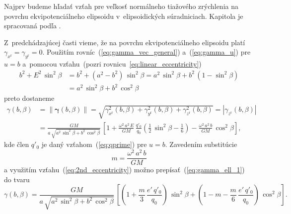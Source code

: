 \documentclass[a4paper, 12pt]{book}
\begin{document}
Najprv budeme hľadať vzťah pre veľkosť normálneho tiažového zrýchlenia na 
povrchu ekvipotenciálneho elipsoidu v~elipsoidických súradniciach.  Kapitola je 
spracovaná podľa \textcite{MoritzPhysicalGeodesy}.

Z~predchádzajúcej časti vieme, že na povrchu ekvipotenciálneho elipsoidu platí 
$\gamma_{x^\mathrm{r}} = \gamma_{y^\mathrm{r}} = 0$.  Použitím 
rovníc~(\ref{eq:gamma_vec_general}) a~(\ref{eq:gamma_u}) pre $u = b$ a~pomocou 
vzťahu~(pozri rovnicu~\ref{eq:linear_eccentricity})
%
\begin{equation}
\begin{split}
b^2 + E^2 \, \sin^2\beta &= b^2 + (a^2 - b^2) \, \sin^2\beta = a^2 \, 
\sin^2\beta + b^2 \, (1 - \sin^2\beta)\\
%
&= a^2 \, \sin^2\beta + b^2 \, \cos^2\beta
\end{split}
\end{equation}
%
preto dostaneme
%
\begin{equation}
\label{eq:gamma_ell_1}
\begin{split}
\gamma(b, \beta) &= \| \boldsymbol \gamma(b, \beta) \| 
= \sqrt{\gamma^2_{x^\mathrm{r}}(b, \beta) + \gamma^2_{y^\mathrm{r}}(b, \beta) 
+ \gamma^2_{z^\mathrm{r}}(b, \beta)} = | \gamma_{z^\mathrm{r}}(b, \beta) |\\
%
&= \frac{GM}{a \, \sqrt{a^2 \, \sin^2\beta + b^2 \, \cos^2\beta}} \, \left[ 
1 + \frac{\omega^2 \, a^2 \, E}{GM} \, \frac{q'_0}{q_0} \left( \frac{1}{2} \, 
\sin^2\beta - \frac{1}{6} \right) - \frac{\omega^2 \, a^2 \, b}{GM} \, 
\cos^2\beta \right]
{,}
\end{split}
\end{equation}
%
kde člen $q'_0$ je daný vzťahom~(\ref{eq:qprime}) pre $u = b$.  Zavedením 
substitúcie
%
\begin{equation}
m = \frac{\omega^2 \, a^2 \, b}{GM}
\end{equation}
%
a využitím vzťahu~(\ref{eq:2nd_eccentricity}) možno 
prepísať~(\ref{eq:gamma_ell_1}) do tvaru
%
\begin{equation}
\label{eq:gamma_ell_2}
\gamma(b, \beta) = \frac{GM}{a \, \sqrt{a^2 \, \sin^2\beta + b^2 \, 
\cos^2\beta}} \, \left[ \left( 1 + \frac{m}{3} \, \frac{e' \, q'_0}{q_0} 
\right) \, \sin^2\beta + \left( 1 - m - \frac{m}{6} \, \frac{e' \, q'_0}{q_0} 
\right) \, \cos^2\beta
\right]{.}
\end{equation}
\end{document}

